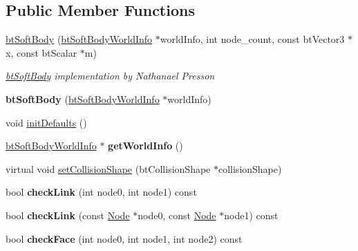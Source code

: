 \subsection*{Public Member Functions}
\begin{DoxyCompactItemize}
\item 
\mbox{\label{classbtSoftBody_a842480e0f75b82a50f0e5e606e2ac40b}} 
\hyperlink{classbtSoftBody_a842480e0f75b82a50f0e5e606e2ac40b}{bt\+Soft\+Body} (\hyperlink{structbtSoftBodyWorldInfo}{bt\+Soft\+Body\+World\+Info} $\ast$world\+Info, int node\+\_\+count, const bt\+Vector3 $\ast$x, const bt\+Scalar $\ast$m)
\begin{DoxyCompactList}\small\item\em \hyperlink{classbtSoftBody}{bt\+Soft\+Body} implementation by Nathanael Presson \end{DoxyCompactList}\item 
\mbox{\label{classbtSoftBody_a63dc6650741946528320f46770e20519}} 
{\bfseries bt\+Soft\+Body} (\hyperlink{structbtSoftBodyWorldInfo}{bt\+Soft\+Body\+World\+Info} $\ast$world\+Info)
\item 
void \hyperlink{classbtSoftBody_ae07c09d9c2937897c3690c1a3970bf61}{init\+Defaults} ()
\item 
\mbox{\label{classbtSoftBody_a306c96275bd2811b98ec5f9f3849e6f6}} 
\hyperlink{structbtSoftBodyWorldInfo}{bt\+Soft\+Body\+World\+Info} $\ast$ {\bfseries get\+World\+Info} ()
\item 
virtual void \hyperlink{classbtSoftBody_aced0f5421eeb1491a3fd77bb91e2e5af}{set\+Collision\+Shape} (bt\+Collision\+Shape $\ast$collision\+Shape)
\item 
\mbox{\label{classbtSoftBody_a041724d78e504947eac03c41be20f27f}} 
bool {\bfseries check\+Link} (int node0, int node1) const
\item 
\mbox{\label{classbtSoftBody_af7cbb16591dbca6bf48713a1162be140}} 
bool {\bfseries check\+Link} (const \hyperlink{structbtSoftBody_1_1Node}{Node} $\ast$node0, const \hyperlink{structbtSoftBody_1_1Node}{Node} $\ast$node1) const
\item 
\mbox{\label{classbtSoftBody_a0e5163f28d6ccbfde183b35b23293046}} 
bool {\bfseries check\+Face} (int node0, int node1, int node2) const

\end{DoxyCompactItemize}
